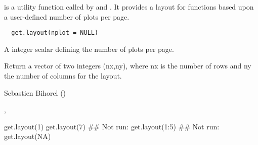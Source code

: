 %
\begin{Description}\relax
{} is a utility function called by  and 
. It provides a layout for  functions based
upon a user-defined number of plots per page.
\end{Description}
%
\begin{Usage}
\begin{verbatim}
  get.layout(nplot = NULL)
\end{verbatim}
\end{Usage}
%
\begin{Arguments}
\begin{ldescription}
\item[\code{nplot}] A integer scalar defining the number of plots per page.
\end{ldescription}
\end{Arguments}
%
\begin{Value}
Return a vector of two integers (nx,ny), where nx is the number of rows and
ny the number of columns for the  layout.
\end{Value}
%
\begin{Author}\relax
Sebastien Bihorel ()
\end{Author}
%
\begin{SeeAlso}\relax
{},
\end{SeeAlso}
%
\begin{Examples}
\begin{ExampleCode}
  get.layout(1)
  get.layout(7)
  ## Not run: get.layout(1:5)
  ## Not run: get.layout(NA)
\end{ExampleCode}
\end{Examples}
